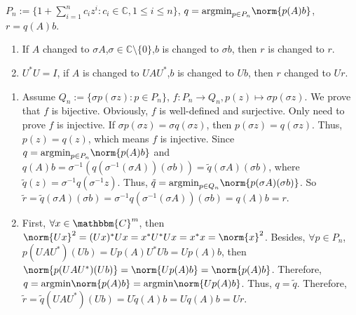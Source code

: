 \documentclass{ctexart}
\newcommand{\argmin}{\mathrm{argmin}}
\begin{document}
\begin{problem}\label{pro:5}
  \(P_n:=\{1+\sum_{i=1}^{n} c_i z^i:c_i \in \mathbb{C}, 1 \leq i \leq n\} \), \(q=\argmin_{p \in P_n} \norm{p(A)b} \), \(r= q(A)b \).
  \begin{enumerate}
    \item If \(A  \) changed to \(\sigma A \),\(\sigma \in \mathbb{C} \setminus\{0\} \),\(b \) is changed to \(\sigma b \), then \(r \) is changed to \(r \).
    \item \(U^* U =I \), if \(A \) is changed to \(U A U^*\),\(b \) is changed to \(Ub \), then \(r \) changed to \(Ur \).
  \end{enumerate}
\end{problem}
\begin{solution}
  \begin{enumerate}
    \item Assume \(Q_n:=\{\sigma p(\sigma z): p \in P_n\} \), \(f: P_n \to Q_n, p(z) \mapsto \sigma p(\sigma z)\). We prove that \(f \) is bijective.
      Obviously, \(f \) is well-defined and surjective. Only need to prove \(f \) is injective.
      If \(\sigma p(\sigma z) =\sigma q(\sigma z) \), then \(p(\sigma z)=q(\sigma z) \). Thus, \(p(z)=q(z) \), which means \(f \) is injective.
      Since \(q =\argmin_{p \in P_n} \norm{p(A)b}\) and \(q(A)b= \sigma^{-1}(q(\sigma^{-1} (\sigma A)) (\sigma b)) =\tilde{q}(\sigma A) (\sigma b) \), where \(\tilde{q}(z)=\sigma^{-1}q(\sigma^{-1} z)\).
      Thus, \(\tilde{q} = \argmin_{p \in Q_n} \norm{p(\sigma A)(\sigma b)} \).
      So \(\tilde{r}=\tilde{q}(\sigma A) (\sigma b) = \sigma^{-1}q(\sigma^{-1} (\sigma A))(\sigma b) =q(A)b=r \).
    \item First, \(\forall x \in \mathbbm{C}^m \), then \(\norm{Ux}^2=(Ux)^* Ux=x^* U^* U x =x^* x =\norm{x}^2 \). Besides, \(\forall p \in P_n \), \(p(U AU^*)(Ub)=U p(A) U^* U b =U p(A) b \), then \(\norm{p(UAU^*)(Ub)} = \norm{Up(A)b}=\norm{p(A)b} \).
      Therefore, \(q =\argmin \norm{p(A)b}= \argmin \norm{Up(A)b}\). Thus, \(q = \tilde{q} \). Therefore, \(\tilde{r}= \tilde{q}(UAU^*)(Ub)=U \tilde{q}(A)b =U q(A)b=U r\).
  \end{enumerate}

\end{solution}
\end{document}
